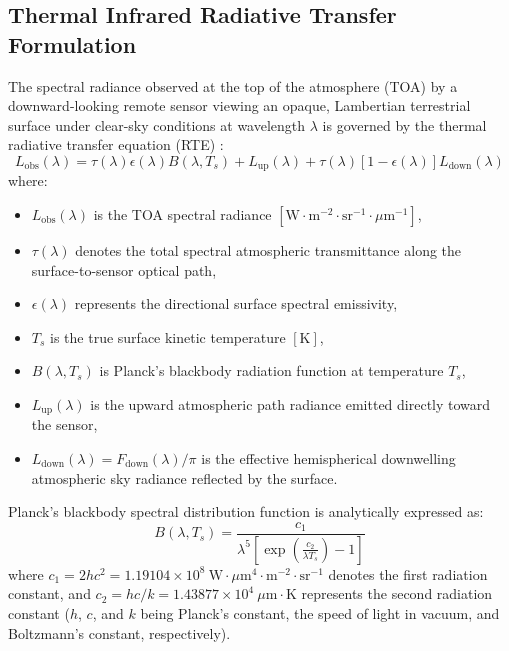 \documentclass[journal]{IEEEtran}
\begin{document}
\subsection{Thermal Infrared Radiative Transfer Formulation}
The spectral radiance observed at the top of the atmosphere (TOA) by a downward-looking remote sensor viewing an opaque, Lambertian terrestrial surface under clear-sky conditions at wavelength $\lambda$ is governed by the thermal radiative transfer equation (RTE) \cite{salisbury1992emissivity, perezplanells2017retrieval}:
\begin{equation}
L_{\text{obs}}(\lambda) = \tau(\lambda)\epsilon(\lambda)B(\lambda, T_s) + L_{\text{up}}(\lambda) + \tau(\lambda)[1 - \epsilon(\lambda)]L_{\text{down}}(\lambda)
\label{eq:rte}
\end{equation}
where:
\begin{itemize}
    \item $L_{\text{obs}}(\lambda)$ is the TOA spectral radiance $[\text{W}\cdot\text{m}^{-2}\cdot\text{sr}^{-1}\cdot\mu\text{m}^{-1}]$,
    \item $\tau(\lambda)$ denotes the total spectral atmospheric transmittance along the surface-to-sensor optical path,
    \item $\epsilon(\lambda)$ represents the directional surface spectral emissivity,
    \item $T_s$ is the true surface kinetic temperature $[\text{K}]$,
    \item $B(\lambda, T_s)$ is Planck's blackbody radiation function at temperature $T_s$,
    \item $L_{\text{up}}(\lambda)$ is the upward atmospheric path radiance emitted directly toward the sensor,
    \item $L_{\text{down}}(\lambda) = F_{\text{down}}(\lambda)/\pi$ is the effective hemispherical downwelling atmospheric sky radiance reflected by the surface.
\end{itemize}

Planck's blackbody spectral distribution function is analytically expressed as:
\begin{equation}
B(\lambda, T_s) = \frac{c_1}{\lambda^5 \left[\exp\left(\frac{c_2}{\lambda T_s}\right) - 1\right]}
\label{eq:planck}
\end{equation}
where $c_1 = 2hc^2 = 1.19104 \times 10^8\ \text{W}\cdot\mu\text{m}^4\cdot\text{m}^{-2}\cdot\text{sr}^{-1}$ denotes the first radiation constant, and $c_2 = hc/k = 1.43877 \times 10^4\ \mu\text{m}\cdot\text{K}$ represents the second radiation constant ($h$, $c$, and $k$ being Planck's constant, the speed of light in vacuum, and Boltzmann's constant, respectively).
\end{document}
